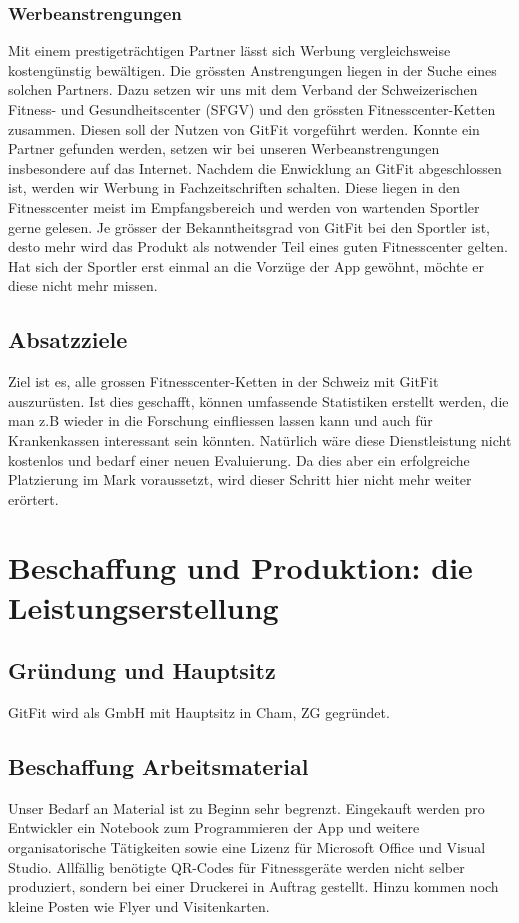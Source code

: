\subsubsection{Werbeanstrengungen}
Mit einem prestigeträchtigen Partner lässt sich Werbung vergleichsweise kostengünstig bewältigen. Die grössten Anstrengungen liegen in der Suche eines solchen Partners. Dazu setzen wir uns mit dem Verband der Schweizerischen Fitness- und Gesundheitscenter (SFGV) und den grössten Fitnesscenter-Ketten zusammen. Diesen soll der Nutzen von GitFit vorgeführt werden. Konnte ein Partner gefunden werden, setzen wir bei unseren Werbeanstrengungen insbesondere auf das Internet. Nachdem die Enwicklung an GitFit abgeschlossen ist, werden wir Werbung in Fachzeitschriften schalten. Diese liegen in den Fitnesscenter meist im Empfangsbereich und werden von wartenden Sportler gerne gelesen. Je grösser der Bekanntheitsgrad von GitFit bei den Sportler ist, desto mehr wird das Produkt als notwender Teil eines guten Fitnesscenter gelten. Hat sich der Sportler erst einmal an die Vorzüge der App gewöhnt, möchte er diese nicht mehr missen.

\subsection{Absatzziele}
Ziel ist es, alle grossen Fitnesscenter-Ketten in der Schweiz mit GitFit auszurüsten. Ist dies geschafft, können umfassende Statistiken erstellt werden, die man z.B wieder in die Forschung einfliessen lassen kann und auch für Krankenkassen interessant sein könnten. Natürlich wäre diese Dienstleistung nicht kostenlos und bedarf einer neuen Evaluierung. Da dies aber ein erfolgreiche Platzierung im Mark voraussetzt, wird dieser Schritt hier nicht mehr weiter erörtert.

\section{Beschaffung und Produktion: die Leistungserstellung}
\subsection{Gründung und Hauptsitz}
GitFit wird als GmbH mit Hauptsitz in Cham, ZG gegründet.
\subsection{Beschaffung Arbeitsmaterial}
Unser Bedarf an Material ist zu Beginn sehr begrenzt. Eingekauft werden pro Entwickler ein Notebook zum Programmieren der App und weitere organisatorische Tätigkeiten sowie eine Lizenz für Microsoft Office und Visual Studio. Allfällig benötigte QR-Codes für Fitnessgeräte werden nicht selber produziert, sondern bei einer Druckerei in Auftrag gestellt. Hinzu kommen noch kleine Posten wie Flyer und Visitenkarten.
